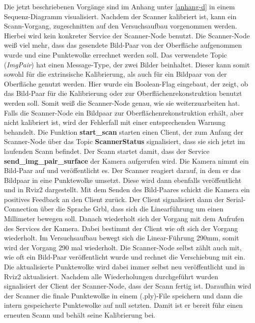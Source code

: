 		Die jetzt beschriebenen Vorgänge sind im Anhang unter \ref{anhang-d} in einem Sequenz-Diagramm visualisiert. \newline
		Nachdem der Scanner kalibriert ist, kann ein Scann-Vorgang, zugeschnitten auf den Versuchsaufbau vorgenommen werden. Hierbei wird kein konkreter Service der Scanner-Node benutzt. Die Scanner-Node weiß viel mehr, dass das gesendete Bild-Paar von der Oberfläche aufgenommen wurde und eine Punktewolke errechnet werden soll. Das verwendete Topic (\textit{ImgPair}) hat einen Message-Type, der zwei Bilder beinhaltet. Dieser kann somit sowohl für die extrinsische Kalibrierung, als auch für ein Bildpaar von der Oberfläche genutzt werden. Hier wurde ein Boolean-Flag eingebaut, der zeigt, ob das Bild-Paar für die Kalibrierung oder zur Oberflächenrekonstruktion benutzt werden soll. Somit weiß die Scanner-Node genau, wie sie weiterzuarbeiten hat. Falls die Scanner-Node ein Bildpaar zur Oberflächenrekonstruktion erhält, aber nicht kalibriert ist, wird der Fehlerfall mit einer entsprechenden Warnung behandelt. \newline
		Die Funktion \textbf{start\_scan} starten einen Client, der zum Anfang der Scanner-Node über das Topic \textbf{ScannerStatus} signalisiert, dass sie sich jetzt im laufenden Scann befindet. Der Scann startet damit, dass der Service \textbf{send\_img\_pair\_surface} der Kamera aufgerufen wird. Die Kamera nimmt ein Bild-Paar auf und veröffentlicht es. Der Scanner reagiert darauf, in dem er das Bildpaar in eine Punktewolke umsetzt. Diese wird dann ebenfalls veröffentlicht und in Rviz2 dargestellt. Mit dem Senden des Bild-Paares schickt die Kamera ein positives Feedback an den Client zurück. Der Client signalisiert dann der Serial-Connection über die Sprache Grbl, dass sich die Linearführung um einen Millimeter bewegen soll. Danach wiederholt sich der Vorgang mit dem Aufrufen des Services der Kamera. Dabei bestimmt der Client wie oft sich der Vorgang wiederholt. Im Versuchsaufbau bewegt sich die Linear-Führung 290mm, somit wird der Vorgang 290 mal wiederholt. Die Scanner-Node selbst zählt auch mit, wie oft ein Bild-Paar veröffentlicht wurde und rechnet die Verschiebung mit ein. Die aktualisierte Punktewolke wird dabei immer selbst neu veröffentlicht und in Rviz2 aktualisiert. \newline
		Nachdem alle Wiederholungen durchgeführt wurden signalisiert der Client der Scanner-Node, dass der Scann fertig ist. Daraufhin wird der Scanner die finale Punktewolke in einem (.ply)-File speichern und dann die intern gespeicherte Punktewolke auf null setzten. Damit ist er bereit führ einen erneuten Scann und behält seine Kalibrierung bei.
		

